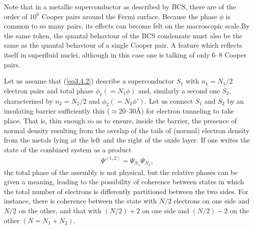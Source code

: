  
 Note that in a metallic superconductor as described by BCS, there are of the order of $10^6$ Cooper pairs around the Fermi surface. Because the phase $\phi$ is common to so many pairs, its effects can become felt on the macroscopic scale.By the same token, the quantal behaviour of the BCS condensate must also be the same as the quantal behaviour of a single Cooper pair. A feature which reflects itself in superfluid nuclei, although in this case one is talking of only 6--8 Cooper pairs.  
 
 
 Let us assume that (\ref{eq3.4.2}) describe a superconductor $S_1$ with $n_1=N_1/2$ electron  pairs and total phase $\phi_1(=N_1\phi)$ and, similarly a second one $S_2$, characterized by $n_2=N_2/2$ and $\phi_2(=N_2\phi')$. Let us connect $S_1$ and $S_2$ by an insulating barrier sufficiently thin ($\approx $20--30\AA) for electron tunneling to take place. That is, thin enough so as to ensure, inside the barrier, the presence of normal density resulting from the overlap of the tails of (normal) electron density from the metals lying at the left and the right of the oxide layer.  If one writes the state of the combined system as a product  
 \begin{align}\label{eq3.4.3}
 \Psi^{(1,2)}=\Psi_{N_1}\Psi_{N_2},
 \end{align}
 the total phase of the assembly is not physical, but the relative phases can be given a meaning, leading to the possibility of coherence between states in which the total number of electrons is differently partitioned between the two sides. For instance, there is coherence between the state with $N/2$ electrons on one side and $N/2$ on the other, and that with $(N/2)+2$ on one side and $(N/2)-2$ on the other $(N=N_1+N_2)$. 
 

